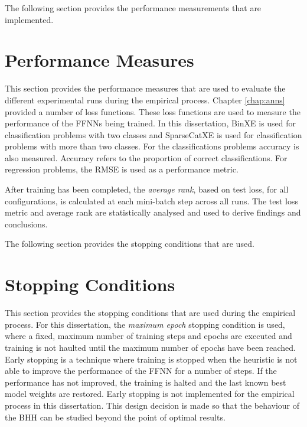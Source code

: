 The following section provides the performance measurements that are implemented.


\section{Performance Measures}\label{sec:methodology:performance_measures}

This section provides the performance measures that are used to evaluate the different experimental runs during the empirical process. Chapter \ref{chap:anns} provided a number of loss functions. These loss functions are used to measure the performance of the \acp{FFNN} being trained. In this dissertation, \acf{BinXE} is used for classification problems with two classes and \acf{SparseCatXE} is used for classification problems with more than two classes. For the classifications problems accuracy is also measured. Accuracy refers to the proportion of correct classifications. For regression problems, the \acf{RMSE} is used as a performance metric.

After training has been completed, the \textit{average rank}, based on test loss, for all configurations, is calculated at each mini-batch step across all runs. The test loss metric and average rank are statistically analysed and used to derive findings and conclusions.

The following section provides the stopping conditions that are used.

\section{Stopping Conditions}\label{sec:methodology:stopping_conditions}

This section provides the stopping conditions that are used during the empirical process. For this dissertation, the \textit{maximum epoch} stopping condition is used, where a fixed, maximum number of training steps and epochs are executed and training is not haulted until the maximum number of epochs have been reached. Early stopping is a technique where training is stopped when the heuristic is not able to improve the performance of the \acs{FFNN} for a number of steps. If the performance has not improved, the training is halted and the last known best model weights are restored. Early stopping is not implemented for the empirical process in this dissertation. This design decision is made so that the behaviour of the \acs{BHH} can be studied beyond the point of optimal results.

